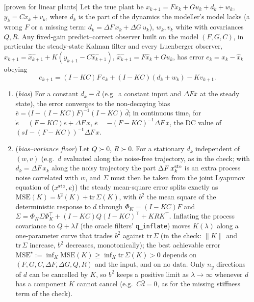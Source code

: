 \begin{proposition}\label{prop:m3-mismatch}
[proven for linear plants] Let the true plant be $x_{k+1}=Fx_k+Gu_k+d_k+w_k$, $y_k=Cx_k+v_k$, where $d_k$ is the part
of the dynamics the modeller's model lacks (a wrong $F$ or a missing term: $d_k=\Delta F\,x_k+\Delta G\,u_k$), $w_k,v_k$
white with covariances $Q,R$. Any fixed-gain predict--correct observer built on the model $(F,G,C)$, in particular the
steady-state Kalman filter and every Luenberger observer, $\hat x_{k+1}=\hat x^-_{k+1}+K(y_{k+1}-C\hat x^-_{k+1})$,
$\hat x^-_{k+1}=F\hat x_k+Gu_k$, has error $e_k=x_k-\hat x_k$ obeying
\[
e_{k+1}=(I-KC)F\,e_k+(I-KC)(d_k+w_k)-Kv_{k+1}.
\]
\begin{enumerate}[label=(\roman*)]
\item (\emph{bias}) For a constant $d_k\equiv\bar d$ (e.g.\ a constant input and $\Delta F\bar x$ at the steady state), the
error converges to the non-decaying bias $\bar e=\big(I-(I-KC)F\big)^{-1}(I-KC)\,\bar d$; in continuous time, for
$\dot e=(F-KC)e+\Delta F\,x$, $\bar e=-(F-KC)^{-1}\Delta F\,\bar x$, the DC value of $(sI-(F-KC))^{-1}\Delta F\,x$.
\item (\emph{bias--variance floor}) Let $Q\succ0$, $R\succ0$. For a stationary $d_k$ independent of $(w,v)$ (e.g.\ $d$
evaluated along the noise-free trajectory, as in the check; with $d_k=\Delta F\,x_k$ along the noisy trajectory the part
$\Delta F\,x^{\rm sto}_k$ is an extra process noise correlated with $w$, and $\Sigma$ must then be taken from the joint
Lyapunov equation of $(x^{\rm sto},e)$) the steady mean-square error splits exactly as
$\mathrm{MSE}(K)=b^2(K)+\mathrm{tr}\,\Sigma(K)$, with $b^2$ the mean square of the deterministic response to $d$
through $\Phi_K=(I-KC)F$ and $\Sigma=\Phi_K\Sigma\Phi_K^\top+(I-KC)Q(I-KC)^\top+KRK^\top$. Inflating the process
covariance to $Q+\lambda I$ (the oracle filters' \texttt{q\_inflate}) moves $K(\lambda)$ along a one-parameter curve
that trades $b^2$ against $\mathrm{tr}\,\Sigma$ (in the check: $\|K\|$ and $\mathrm{tr}\,\Sigma$ increase, $b^2$ decreases,
monotonically); the best achievable error $\mathrm{MSE}^\star:=\inf_K\mathrm{MSE}(K)\ge\inf_K\mathrm{tr}\,\Sigma(K)>0$
depends on $(F,G,C,\Delta F,\Delta G,Q,R)$ and the input, and on no data. Only $n_y$ directions of $d$ can be cancelled
by $K$, so $b^2$ keeps a positive limit as $\lambda\to\infty$ whenever $d$ has a component $K$ cannot cancel (e.g.\
$C\bar d=0$, as for the missing stiffness term of the check).

\end{enumerate}
\end{proposition}

